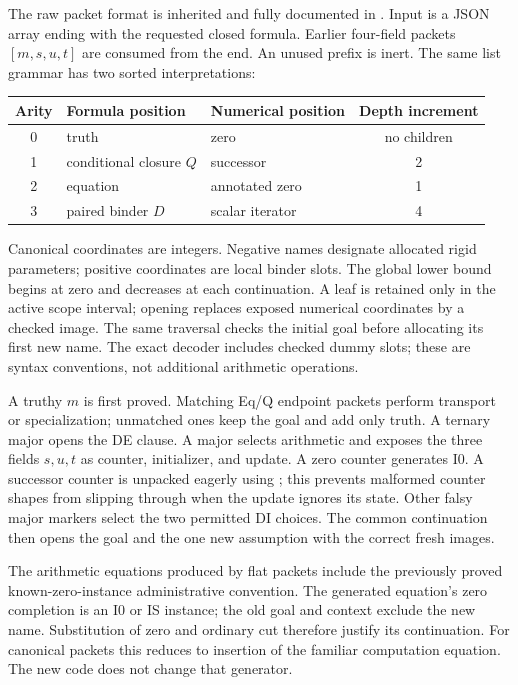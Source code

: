 The raw packet format is inherited and fully documented in
. Input is a JSON array ending
with the requested closed formula. Earlier four-field packets
$[m,s,u,t]$ are consumed from the end. An unused prefix is inert.
The same list grammar has two sorted interpretations:
\begin{center}\small
\begin{tabular}{cllc}
\toprule
Arity & Formula position & Numerical position & Depth increment\\
\midrule
0 & truth & zero & no children\\
1 & conditional closure $Q$ & successor &2\\
2 & equation & annotated zero &1\\
3 & paired binder $D$ & scalar iterator &4\\
\bottomrule
\end{tabular}
\end{center}
Canonical coordinates are integers. Negative names designate
allocated rigid parameters; positive coordinates are local binder
slots. The global lower bound begins at zero and decreases at each
continuation. A leaf is retained only in the active scope interval;
opening replaces exposed numerical coordinates by a checked image.
The same traversal checks the initial goal before allocating its
first new name. The exact decoder includes checked dummy slots;
these are syntax conventions, not additional arithmetic operations.

A truthy $m$ is first proved. Matching Eq/Q endpoint packets perform
transport or specialization; unmatched ones keep the goal and add
only truth. A ternary major opens the DE clause. A 
major selects arithmetic and exposes the three fields $s,u,t$ as
counter, initializer, and update. A zero counter generates I0.
A successor counter is unpacked eagerly using ;
this prevents malformed counter shapes from slipping through when
the update ignores its state. Other falsy major markers select the
two permitted DI choices. The common continuation then opens the
goal and the one new assumption with the correct fresh images.

The arithmetic equations produced by flat packets include the
previously proved known-zero-instance administrative convention.
The generated equation's zero completion is an I0 or IS instance;
the old goal and context exclude the new name. Substitution of zero
and ordinary cut therefore justify its continuation. For canonical
packets this reduces to insertion of the familiar computation
equation. The new code does not change that generator.

